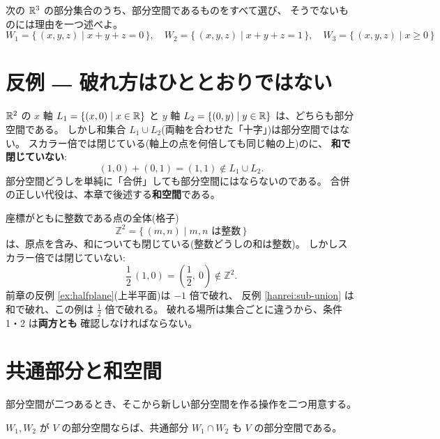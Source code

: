 \begin{mondai}\label{q:subsp}
次の $\mathbb{R}^3$ の部分集合のうち、部分空間であるものをすべて選び、
そうでないものには理由を一つ述べよ。
\[
W_1 = \{\, (x, y, z) \mid x + y + z = 0 \,\}, \quad
W_2 = \{\, (x, y, z) \mid x + y + z = 1 \,\}, \quad
W_3 = \{\, (x, y, z) \mid x \ge 0 \,\}
\]
\end{mondai}

\section{反例 ― 破れ方はひととおりではない}

\begin{hanrei}[和集合は部分空間とは限らない]\label{hanrei:sub-union}
$\mathbb{R}^2$ の $x$ 軸 $L_1 = \{(x, 0) \mid x \in \mathbb{R}\}$ と
$y$ 軸 $L_2 = \{(0, y) \mid y \in \mathbb{R}\}$ は、どちらも部分空間である。
しかし和集合 $L_1 \cup L_2$(両軸を合わせた「十字」)は部分空間ではない。
スカラー倍では閉じている(軸上の点を何倍しても同じ軸の上)のに、
\textbf{和で閉じていない}:
\[
(1, 0) + (0, 1) = (1, 1) \notin L_1 \cup L_2.
\]
部分空間どうしを単純に「合併」しても部分空間にはならないのである。
合併の正しい代役は、本章で後述する\textbf{和空間}である。
\end{hanrei}

\begin{hanrei}[和で閉じてもスカラー倍で破れる]\label{hanrei:sub-lattice}
座標がともに整数である点の全体(格子)
\[
\mathbb{Z}^2 = \{\, (m, n) \mid m, n \text{ は整数} \,\}
\]
は、原点を含み、和についても閉じている(整数どうしの和は整数)。
しかしスカラー倍では閉じていない:
\[
\frac{1}{2}\,(1, 0) = \left(\frac{1}{2},\ 0\right) \notin \mathbb{Z}^2.
\]
前章の反例 \ref{ex:halfplane}(上半平面)は $-1$ 倍で破れ、
反例 \ref{hanrei:sub-union} は和で破れ、この例は $\frac{1}{2}$ 倍で破れる。
破れる場所は集合ごとに違うから、条件 1・2 は\textbf{両方とも}
確認しなければならない。
\end{hanrei}

\section{共通部分と和空間}

部分空間が二つあるとき、そこから新しい部分空間を作る操作を二つ用意する。

\begin{teiri}[共通部分は部分空間]\label{thm:sub-cap}
$W_1, W_2$ が $V$ の部分空間ならば、共通部分 $W_1 \cap W_2$ も
$V$ の部分空間である。
\end{teiri}

